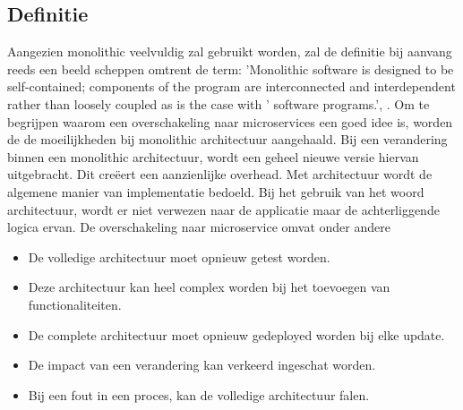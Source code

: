 \subsection{Definitie}
Aangezien monolithic veelvuldig zal gebruikt worden, zal de definitie bij aanvang reeds een beeld scheppen omtrent de term:  'Monolithic software is designed to be self-contained; components of the program are interconnected and interdependent rather than loosely coupled as is the case with ' software programs.',  \textcite{Wigmore2016}.
Om te begrijpen waarom een overschakeling naar microservices een goed idee is, worden de de moeilijkheden bij monolithic architectuur aangehaald. Bij een verandering binnen een monolithic architectuur, wordt een geheel nieuwe  versie hiervan uitgebracht. Dit creëert een aanzienlijke overhead. Met architectuur wordt de algemene manier van implementatie bedoeld. Bij het gebruik van het woord architectuur, wordt er niet verwezen naar de applicatie maar de achterliggende logica ervan.
De overschakeling naar microservice omvat onder andere
\begin{itemize}
	\item De volledige architectuur moet opnieuw getest worden.
	\item Deze architectuur kan heel complex worden bij het toevoegen van functionaliteiten.
	\item De complete architectuur moet opnieuw gedeployed worden bij elke update.
	\item De impact van een verandering kan verkeerd ingeschat worden.
	\item Bij een fout in een proces, kan de volledige architectuur falen.
\end{itemize}
